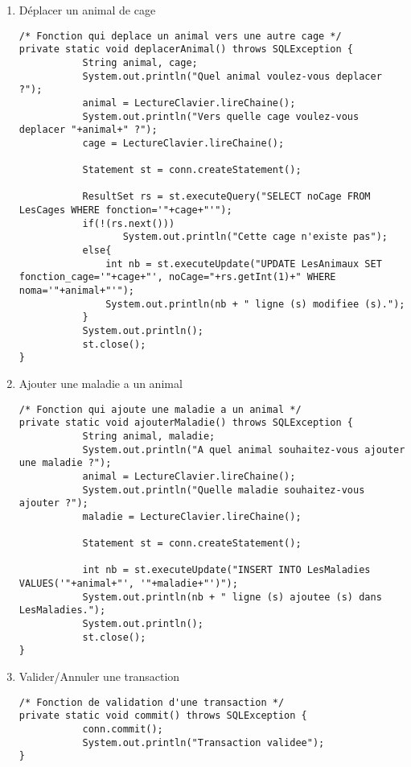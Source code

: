 \documentclass{article}
\begin{document}
\begin{enumerate}[label=\arabic*)]
	\item Déplacer un animal de cage

	\begin{lstlisting}
/* Fonction qui deplace un animal vers une autre cage */
private static void deplacerAnimal() throws SQLException {
           String animal, cage;
           System.out.println("Quel animal voulez-vous deplacer ?");
           animal = LectureClavier.lireChaine();
           System.out.println("Vers quelle cage voulez-vous deplacer "+animal+" ?");
           cage = LectureClavier.lireChaine();
           
           Statement st = conn.createStatement();
            
           ResultSet rs = st.executeQuery("SELECT noCage FROM LesCages WHERE fonction='"+cage+"'");
           if(!(rs.next()))
                  System.out.println("Cette cage n'existe pas");
           else{
               int nb = st.executeUpdate("UPDATE LesAnimaux SET fonction_cage='"+cage+"', noCage="+rs.getInt(1)+" WHERE noma='"+animal+"'");         
               System.out.println(nb + " ligne (s) modifiee (s).");            
           }
           System.out.println();
           st.close();
}	
	\end{lstlisting}	

	\item Ajouter une maladie a un animal

	\begin{lstlisting}
/* Fonction qui ajoute une maladie a un animal */
private static void ajouterMaladie() throws SQLException {
           String animal, maladie;
           System.out.println("A quel animal souhaitez-vous ajouter une maladie ?");
           animal = LectureClavier.lireChaine();
           System.out.println("Quelle maladie souhaitez-vous ajouter ?");
           maladie = LectureClavier.lireChaine();
            
           Statement st = conn.createStatement();

           int nb = st.executeUpdate("INSERT INTO LesMaladies VALUES('"+animal+"', '"+maladie+"')");
           System.out.println(nb + " ligne (s) ajoutee (s) dans LesMaladies.");
           System.out.println();
           st.close();
}
	\end{lstlisting}

	\item Valider/Annuler une transaction

	\begin{lstlisting}
/* Fonction de validation d'une transaction */
private static void commit() throws SQLException {
           conn.commit();
           System.out.println("Transaction validee");
}
				

\end{lstlisting}
\end{enumerate}
\end{document}
